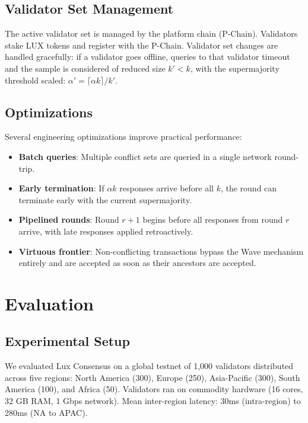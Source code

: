 \documentclass[11pt,a4paper]{article}
\begin{document}
\subsection{Validator Set Management}

The active validator set is managed by the platform chain (P-Chain). Validators stake LUX
tokens and register with the P-Chain. Validator set changes are handled gracefully: if a
validator goes offline, queries to that validator timeout and the sample is considered of
reduced size $k' < k$, with the supermajority threshold scaled: $\alpha' = \lceil \alpha k \rceil / k'$.

\subsection{Optimizations}

Several engineering optimizations improve practical performance:
\begin{itemize}[nosep]
\item \textbf{Batch queries}: Multiple conflict sets are queried in a single network round-trip.
\item \textbf{Early termination}: If $\alpha k$ responses arrive before all $k$, the round
can terminate early with the current supermajority.
\item \textbf{Pipelined rounds}: Round $r+1$ begins before all responses from round $r$
arrive, with late responses applied retroactively.
\item \textbf{Virtuous frontier}: Non-conflicting transactions bypass the Wave mechanism
entirely and are accepted as soon as their ancestors are accepted.
\end{itemize}

\section{Evaluation}
\label{sec:evaluation}

\subsection{Experimental Setup}

We evaluated Lux Consensus on a global testnet of 1,000 validators distributed across
five regions: North America (300), Europe (250), Asia-Pacific (300),
South America (100), and Africa (50). Validators ran on commodity hardware (16 cores,
32 GB RAM, 1 Gbps network). Mean inter-region latency: 30ms (intra-region)
to 280ms (NA to APAC).
\end{document}
